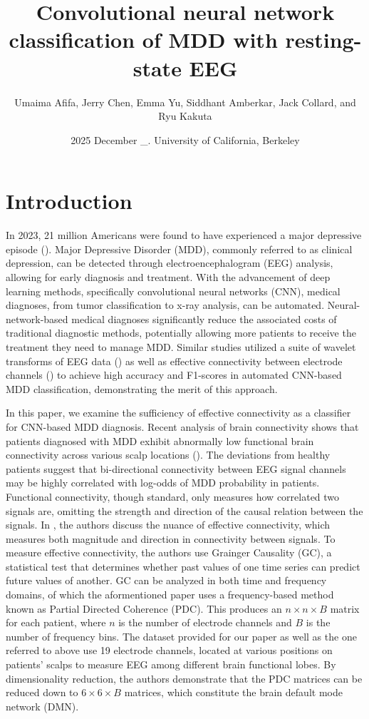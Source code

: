 \documentclass[twocolumn]{NobArticle}
\title{Convolutional neural network classification of MDD with resting-state EEG}
\author{
    Umaima Afifa, Jerry Chen, Emma Yu, Siddhant Amberkar, Jack Collard, and Ryu Kakuta
}
\date{
    2025 December \_. University of California, Berkeley
}
\begin{document}
\small
\maketitle

\section{Introduction}
    In 2023, 21 million Americans were found to have experienced a major depressive episode (\cite{BrodyHughes2025}). Major Depressive Disorder (MDD), commonly referred to as clinical depression, can be detected through electroencephalogram (EEG) analysis, allowing for early diagnosis and treatment. With the advancement of deep learning methods, specifically convolutional neural networks (CNN), medical diagnoses, from tumor classification to x-ray analysis, can be automated. Neural-network-based medical diagnoses significantly reduce the associated costs of traditional diagnostic methods, potentially allowing more patients to receive the treatment they need to manage MDD. Similar studies utilized a suite of wavelet transforms of EEG data (\cite{Bagherzadeh2025_CCADD}) as well as effective connectivity between electrode channels (\cite{Miljevic2023_EEGconnectivity}) to achieve high accuracy and F1-scores in automated CNN-based MDD classification, demonstrating the merit of this approach. 
    
    In this paper, we examine the sufficiency of effective connectivity as a classifier for CNN-based MDD diagnosis. Recent analysis of brain connectivity shows that patients diagnosed with MDD exhibit abnormally low functional brain connectivity across various scalp locations (\cite{Fogelson2020_predictiveEEG_MDD}). The deviations from healthy patients suggest that bi-directional connectivity between EEG signal channels may be highly correlated with log-odds of MDD probability in patients. Functional connectivity, though standard, only measures how correlated two signals are, omitting the strength and direction of the causal relation between the signals. In \cite{Miljevic2023_EEGconnectivity}, the authors discuss the nuance of effective connectivity, which measures both magnitude and direction in connectivity between signals. To measure effective connectivity, the authors use Grainger Causality (GC), a statistical test that determines whether past values of one time series can predict future values of another. GC can be analyzed in both time and frequency domains, of which the aformentioned paper uses a frequency-based method known as Partial Directed Coherence (PDC). This produces an $n\times n\times B$ matrix for each patient, where $n$ is the number of electrode channels and $B$ is the number of frequency bins. The dataset provided for our paper as well as the one referred to above use 19 electrode channels, located at various positions on patients' scalps to measure EEG among different brain functional lobes. By dimensionality reduction, the authors demonstrate that the PDC matrices can be reduced down to $6\times6\times B$ matrices, which constitute the brain default mode network (DMN). 
\end{document}
